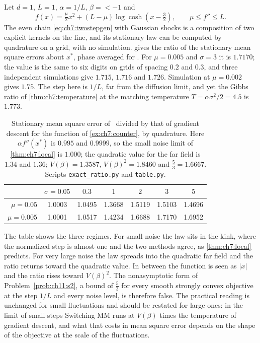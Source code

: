 \begin{example}\label{ex:ch7:counter}
Let $d=1$, $L=1$, $\alpha=1/L$, $\beta=\lt-1$ and
\[
  f(x)=\tfrac\mu2x^2+(L-\mu)\log\cosh(x-\tfrac32),\qquad \mu\le f''\le L .
\]
The even chain \eqref{eq:ch7:twostepgen} with Gaussian shocks is a composition of two explicit kernels on the line, and its stationary law can be computed by quadrature on a grid, with no simulation.  gives the ratio of the stationary mean square errors about $x^\ast$, phase averaged for \smmdet. For $\mu=0.005$ and $\sigma=3$ it is $1.7170$; the value is the same to six digits on grids of spacing $0.2$ and $0.3$, and three independent simulations give $1.715$, $1.716$ and $1.726$. Simulation at $\mu=0.002$ gives $1.75$. The step here is $1/L$, far from the diffusion limit, and yet the Gibbs ratio of \cref{thm:ch7:temperature} at the matching temperature $T=\alpha\sigma^2/2=4.5$ is $1.773$.
\end{example}

\begin{table}[t]
\centering
\small
\begin{tabular}{rcccccc}
\toprule
 & $\sigma=0.05$ & $0.3$ & $1$ & $2$ & $3$ & $5$\\
\midrule
$\mu=0.05$ & 1.0003 & 1.0495 & 1.3668 & 1.5119 & 1.5103 & 1.4696\\
$\mu=0.005$ & 1.0001 & 1.0517 & 1.4234 & 1.6688 & 1.7170 & 1.6952\\
\bottomrule
\end{tabular}
\caption{Stationary mean square error of \smmdet\ divided by that of gradient descent for the function of \cref{ex:ch7:counter}, by quadrature. Here $\alpha f''(x^\ast)$ is $0.995$ and $0.9999$, so the small noise limit of \cref{thm:ch7:local} is $1.000$; the quadratic value for the far field is $1.34$ and $1.36$; $V(\beta)=1.3587$, $V(\beta)^2=1.8460$ and $\tfrac53=1.6667$. Scripts \texttt{exact\_ratio.py} and \texttt{table.py}.}
\label{tab:ch7:beyond}
\end{table}

The table shows the three regimes. For small noise the law sits in the kink, where the normalized step is almost one and the two methods agree, as \cref{thm:ch7:local} predicts. For very large noise the law spreads into the quadratic far field and the ratio returns toward the quadratic value. In between the function is seen as $|x|$ and the ratio rises toward $V(\beta)^2$. The nonasymptotic form of Problem~\ref{prob:ch11:s2}, a bound of $\tfrac53$ for every smooth strongly convex objective at the step $1/L$ and every noise level, is therefore false. The practical reading is unchanged for small fluctuations and should be restated for large ones: in the limit of small steps Switching MM runs at $V(\beta)$ times the temperature of gradient descent, and what that costs in mean square error depends on the shape of the objective at the scale of the fluctuations.

